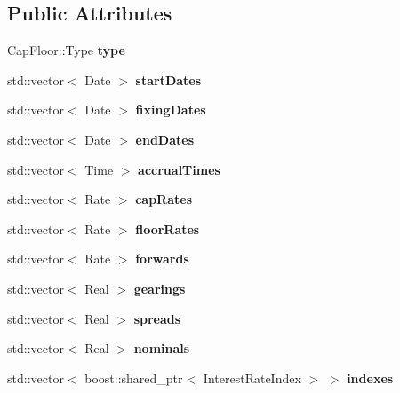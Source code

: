 \subsection*{Public Attributes}
\begin{DoxyCompactItemize}
\item 
Cap\+Floor\+::\+Type {\bfseries type}\label{class_quant_lib_1_1_cap_floor_1_1arguments_a2d5a780c2787f0706673ef307168a8d0}

\item 
std\+::vector$<$ Date $>$ {\bfseries start\+Dates}\label{class_quant_lib_1_1_cap_floor_1_1arguments_af4e7d17c28fccff9bf30eec05f916827}

\item 
std\+::vector$<$ Date $>$ {\bfseries fixing\+Dates}\label{class_quant_lib_1_1_cap_floor_1_1arguments_a3d75816bbc8c743b02b1f75bb65336ef}

\item 
std\+::vector$<$ Date $>$ {\bfseries end\+Dates}\label{class_quant_lib_1_1_cap_floor_1_1arguments_aca75e7199150b723dac0cd896556b7d0}

\item 
std\+::vector$<$ Time $>$ {\bfseries accrual\+Times}\label{class_quant_lib_1_1_cap_floor_1_1arguments_ab3da8658fc15a822a6efa22f0a73ee8e}

\item 
std\+::vector$<$ Rate $>$ {\bfseries cap\+Rates}\label{class_quant_lib_1_1_cap_floor_1_1arguments_a4311cae6427f47868a5507dc6fafeb51}

\item 
std\+::vector$<$ Rate $>$ {\bfseries floor\+Rates}\label{class_quant_lib_1_1_cap_floor_1_1arguments_af28173ee0de4149836c8af113e9f7a33}

\item 
std\+::vector$<$ Rate $>$ {\bfseries forwards}\label{class_quant_lib_1_1_cap_floor_1_1arguments_ab960b557e031986012339d0adc2ac8df}

\item 
std\+::vector$<$ Real $>$ {\bfseries gearings}\label{class_quant_lib_1_1_cap_floor_1_1arguments_a8e24df2092f0b633b94b9ba0b7a1f7fe}

\item 
std\+::vector$<$ Real $>$ {\bfseries spreads}\label{class_quant_lib_1_1_cap_floor_1_1arguments_a74ce6548b1937425d24d0a9d099fa0c7}

\item 
std\+::vector$<$ Real $>$ {\bfseries nominals}\label{class_quant_lib_1_1_cap_floor_1_1arguments_ab2de098db281801cd877eb9baaae3a97}

\item 
std\+::vector$<$ boost\+::shared\+\_\+ptr$<$ Interest\+Rate\+Index $>$ $>$ {\bfseries indexes}\label{class_quant_lib_1_1_cap_floor_1_1arguments_a4ce5c483bb865191bf443f9aacac61f9}

\end{DoxyCompactItemize}


